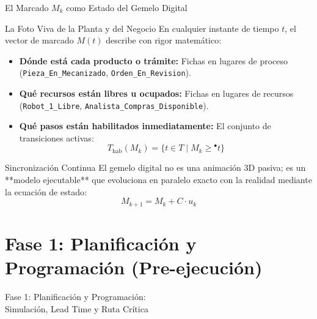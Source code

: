 \documentclass[10pt, aspectratio=169]{beamer}
\begin{document}
\begin{frame}{El Marcado $M_k$ como Estado del Gemelo Digital}
	\begin{block}{La Foto Viva de la Planta y del Negocio}
		En cualquier instante de tiempo $t$, el vector de marcado $M(t)$ describe con rigor matemático:
		\begin{itemize}
			\item \textbf{Dónde está cada producto o trámite:} Fichas en lugares de proceso (\texttt{Pieza\_En\_Mecanizado}, \texttt{Orden\_En\_Revision}).
			\item \textbf{Qué recursos están libres u ocupados:} Fichas en lugares de recursos (\texttt{Robot\_1\_Libre}, \texttt{Analista\_Compras\_Disponible}).
			\item \textbf{Qué pasos están habilitados inmediatamente:} El conjunto de transiciones activas:
			\[ T_{\text{hab}}(M_k) = \{ t \in T \mid M_k \ge {}^\bullet t \} \]
		\end{itemize}
	\end{block}

	\begin{alertblock}{Sincronización Continua}
		El gemelo digital no es una animación 3D pasiva; es un **modelo ejecutable** que evoluciona en paralelo exacto con la realidad mediante la ecuación de estado:
		\[ M_{k+1} = M_k + C \cdot u_k \]
	\end{alertblock}
\end{frame}

\section{Fase 1: Planificación y Programación (Pre-ejecución)}

\begin{frame}{}
	\centering
	\Huge{Fase 1: Planificación y Programación: \\ Simulación, Lead Time y Ruta Crítica}
\end{frame}
\end{document}

